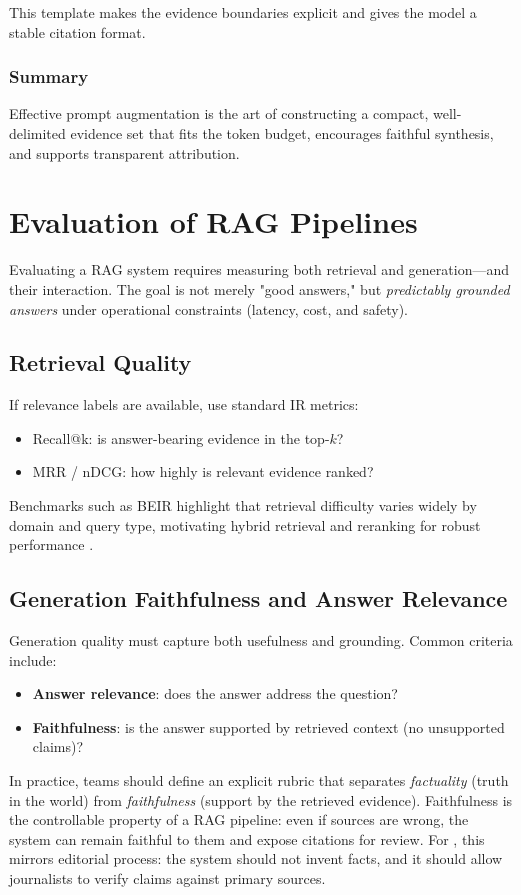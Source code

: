 This template makes the evidence boundaries explicit and gives the model a stable citation format.

\subsubsection*{Summary}
Effective prompt augmentation is the art of constructing a compact, well-delimited evidence set that fits the token budget, encourages faithful synthesis, and supports transparent attribution.

\section{Evaluation of RAG Pipelines}\label{sec:rag-metrics}
Evaluating a RAG system requires measuring both retrieval and generation—and their interaction. The goal is not merely "good answers," but \emph{predictably grounded answers} under operational constraints (latency, cost, and safety).

\subsection{Retrieval Quality}
If relevance labels are available, use standard IR metrics:
\begin{itemize}
    \item Recall@k: is answer-bearing evidence in the top-$k$?
    \item MRR / nDCG: how highly is relevant evidence ranked?
\end{itemize}
Benchmarks such as BEIR highlight that retrieval difficulty varies widely by domain and query type, motivating hybrid retrieval and reranking for robust performance \cite{Thakur2021BEIR}.

\subsection{Generation Faithfulness and Answer Relevance}
Generation quality must capture both usefulness and grounding. Common criteria include:
\begin{itemize}
    \item \textbf{Answer relevance}: does the answer address the question?
    \item \textbf{Faithfulness}: is the answer supported by retrieved context (no unsupported claims)?
\end{itemize}

In practice, teams should define an explicit rubric that separates \emph{factuality} (truth in the world) from \emph{faithfulness} (support by the retrieved evidence). Faithfulness is the controllable property of a RAG pipeline: even if sources are wrong, the system can remain faithful to them and expose citations for review. For \ishtar{}, this mirrors editorial process: the system should not invent facts, and it should allow journalists to verify claims against primary sources.

